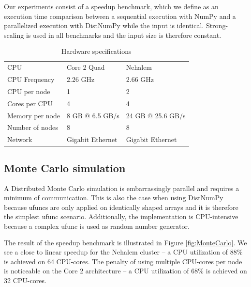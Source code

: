 \documentclass{sigplanconf}
\begin{document}
Our experiments consist of a speedup benchmark, which we define as an execution time comparison between a sequential execution with NumPy and a parallelized execution with DistNumPy while the input is identical. Strong-scaling is used in all benchmarks and the input size is therefore constant.



\begin{table}
\caption{Hardware specifications}
\centering
\begin{tabular}{|lll|}
\hline
CPU & Core 2 Quad & Nehalem\\
CPU Frequency & 2.26 GHz & 2.66 GHz\\
CPU per node & 1 & 2\\
Cores per CPU & 4 & 4\\
Memory per node & 8 GB @ 6.5 GB/s & 24 GB @ 25.6 GB/s\\
Number of nodes & 8 & 8\\
Network & Gigabit Ethernet & Gigabit Ethernet\\
\hline
\end{tabular}
\label{tab:specs}
\end{table}


\subsection{Monte Carlo simulation}
A Distributed Monte Carlo simulation is embarrassingly parallel and requires a minimum of communication.  This is also the case when using DistNumPy because ufuncs are only applied on identically shaped arrays and it is therefore the simplest ufunc scenario. Additionally, the implementation is CPU-intensive because a complex ufunc is used as random number generator. 

The result of the speedup benchmark is illustrated in Figure \ref{fig:MonteCarlo}. We see a close to linear speedup for the Nehalem cluster -- a CPU utilization of 88\% is achieved on 64 CPU-cores. The penalty of using multiple CPU-cores per node is noticeable on the Core 2 architecture -- a CPU utilization of 68\% is achieved on 32 CPU-cores.
\end{document}
